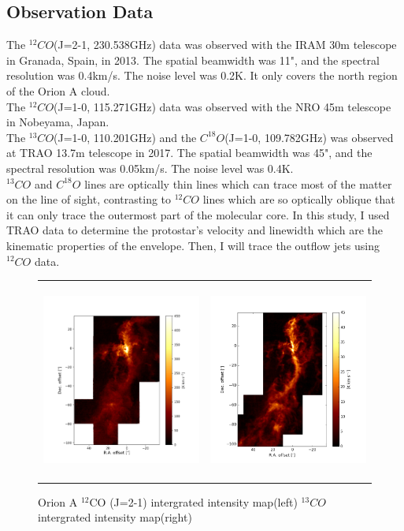 \documentclass[twoside,11pt]{gshs_thesis}
\begin{document}
\subsection{Observation Data}
The $^{12}CO$(J=2-1, 230.538GHz) data was observed with the IRAM 30m telescope in Granada, Spain, in 2013. The spatial beamwidth was 11", and the spectral resolution was 0.4km/s. The noise level was 0.2K. It only covers the north region of the Orion A cloud. \cite{Berne} \\
The $^{12}CO$(J=1-0, 115.271GHz) data was observed with the NRO 45m telescope in Nobeyama, Japan.  \\
The $^{13}CO$(J=1-0, 110.201GHz) and the $C^{18}O$(J=1-0, 109.782GHz) was observed at TRAO 13.7m telescope in 2017. The spatial beamwidth was 45", and the spectral resolution was 0.05km/s. The noise level was 0.4K.\\
$^{13}CO$ and $C^{18}O$ lines are optically thin lines which can trace most of the matter on the line of sight, contrasting to $^{12}CO$ lines which are so optically oblique that it can only trace the outermost part of the molecular core. In this study, I used TRAO data to determine the protostar's velocity and linewidth which are the kinematic properties of the envelope. Then, I will trace the outflow jets using $^{12}CO$ data.
\begin{figure}[h]
	\begin{center}
		\begin{tabular}{cc}
			\includegraphics[height=6.5cm]{RNE_12CO_Orion.png} & \includegraphics[height=6.5cm]{Orion_13CO_intmap.png}
		\end{tabular}
	\end{center}
	\caption{Orion A $^{12}$CO (J=2-1) intergrated intensity map(left) $^{13}CO$ intergrated intensity map(right)}
\end{figure}
\end{document}
